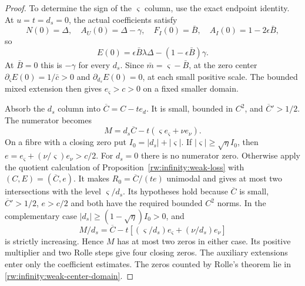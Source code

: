 \begin{proof}
To determine the sign of the $\varsigma$ column, use the exact
endpoint identity. At $u=t=d_s=0$, the actual coefficients satisfy
\[
 N(0)=\Delta,\quad A_U(0)=\Delta-\gamma,\quad
 F_I(0)=\bar B,\quad A_I(0)=1-2\epsilon\bar B,
\]
so
\begin{equation}\label{rw:infinity:weak-endpoint-E}
 E(0)=\epsilon\bar B\lambda\Delta-(1-\epsilon\bar B)\gamma.
\end{equation}
At $\bar B=0$ this is $-\gamma$ for every $d_s$.
Since $\bar m=\varsigma-\bar B$, at the zero center
$\partial_\varsigma E(0)=1/\bar c>0$ and
$\partial_{d_s}E(0)=0$, at each small positive scale.
The bounded mixed extension then gives $e_\varsigma>c>0$
on a fixed smaller domain.

Absorb the $d_s$ column into $\overline C=C-te_d$.
It is small, bounded in $C^2$, and $\overline C'>1/2$.
The numerator becomes
\[
 M=d_s\overline C-t(\varsigma e_\varsigma+\nu e_\nu).
\]
On a fibre with a closing zero put $I_0=|d_s|+|\varsigma|$.
If $|\varsigma|\ge\sqrt\eta I_0$, then
$e=e_\varsigma+(\nu/\varsigma)e_\nu>c/2$.
For $d_s=0$ there is no numerator zero. Otherwise apply the quotient
calculation of
Proposition~\ref{rw:infinity:weak-loss} with
$(C,E)=(\overline C,e)$. It makes
$R_0=\overline C/(te)$ unimodal and gives at most two intersections
with the level $\varsigma/d_s$. Its hypotheses hold because
$\overline C$ is small, $\overline C'>1/2$, $e>c/2$ and both
have the required bounded $C^2$ norms.
In the complementary case $|d_s|\ge(1-\sqrt\eta)I_0>0$, and
\[
 M/d_s=\overline C-t[(\varsigma/d_s)e_\varsigma
                                      +(\nu/d_s)e_\nu]
\]
is strictly increasing. Hence $M$ has at most two zeros in either
case. Its positive multiplier and two Rolle steps give four closing
zeros. The auxiliary extensions enter only the coefficient estimates.
The zeros counted by Rolle's theorem lie in
\eqref{rw:infinity:weak-center-domain}.
\end{proof}

